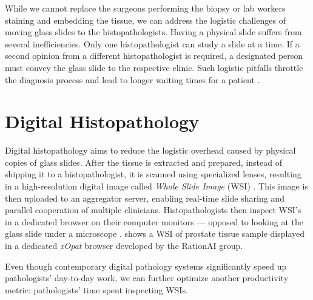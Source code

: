 While we cannot replace the surgeons performing the biopsy or lab workers staining and embedding the tissue, we can address the logistic challenges of moving glass slides to the histopathologists.
Having a physical slide suffers from several inefficiencies. 
Only one histopathologist can study a slide at a time. If a second opinion from a different histopathologist is required, a designated person must convey the glass slide to the respective clinic.
Such logistic pitfalls throttle the diagnosis process and lead to longer waiting times for a patient \cite{from-traditional-to-digital-histopathology}.

\section{Digital Histopathology}

Digital histopathology aims to reduce the logistic overhead caused by physical copies of glass slides.
After the tissue is extracted and prepared, instead of shipping it to a histopathologist, it is scanned using specialized lenses, resulting in a high-resolution digital image called \emph{Whole Slide Image} (WSI) \cite{from-traditional-to-digital-histopathology}.
This image is then uploaded to an aggregator server, enabling real-time slide sharing and parallel cooperation of multiple clinicians.
Histopathologists then inspect WSI's in a dedicated browser on their computer monitors --- opposed to looking at the glass slide under a microscope \cite{digital-histopathology-process}.  shows a WSI of prostate tissue sample displayed in a dedicated \emph{xOpat} browser developed by the RationAI group.

Even though contemporary digital pathology systems significantly speed up pathologists' day-to-day work, we can further optimize another productivity metric: pathologists' time spent inspecting WSIs.

